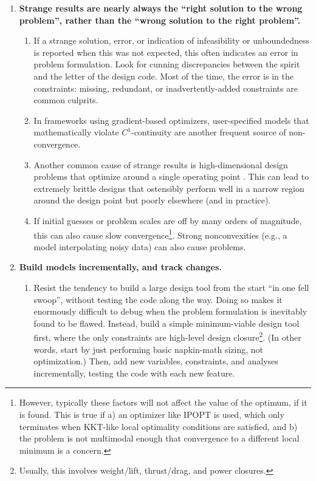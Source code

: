 \begin{enumerate}
\begin{enumerate}
    \end{enumerate}
    \item \textbf{Strange results are nearly always the ``right solution to the wrong problem'', rather than the ``wrong solution to the right problem''.}
    \begin{enumerate}
        \item If a strange solution, error, or indication of infeasibility or unboundedness is reported when this was not expected, this often indicates an error in problem formulation. Look for cunning discrepancies between the spirit and the letter of the design code. Most of the time, the error is in the constraints: missing, redundant, or inadvertently-added constraints are common culprits.
        \item In frameworks using gradient-based optimizers, user-specified models that mathematically violate $C^1$-continuity are another frequent source of non-convergence.
        \item Another common cause of strange results is high-dimensional design problems that optimize around a single operating point \cite{drela_pros_1998}. This can lead to extremely brittle designs that ostensibly perform well in a narrow region around the design point but poorly elsewhere (and in practice).
        \item If initial guesses or problem scales are off by many orders of magnitude, this can also cause slow convergence\footnote{However, typically these factors will not affect the value of the optimum, if it is found. This is true if a) an optimizer like IPOPT is used, which only terminates when KKT-like local optimality conditions are satisfied, and b) the problem is not multimodal enough that convergence to a different local minimum is a concern.}. Strong nonconvexities (e.g., a model interpolating noisy data) can also cause problems.
    \end{enumerate}
    \item \textbf{Build models incrementally, and track changes.}
    \begin{enumerate}
        \item Resist the tendency to build a large design tool from the start ``in one fell swoop'', without testing the code along the way. Doing so makes it enormously difficult to debug when the problem formulation is inevitably found to be flawed. Instead, build a simple minimum-viable design tool first, where the only constraints are high-level design closure\footnote{Usually, this involves weight/lift, thrust/drag, and power closures.}. (In other words, start by just performing basic napkin-math sizing, not optimization.) Then, add new variables, constraints, and analyses incrementally, testing the code with each new feature.

\end{enumerate}
\end{enumerate}
